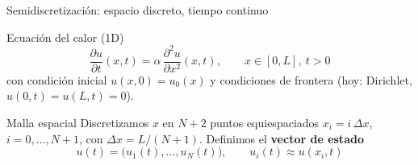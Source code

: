 \documentclass[aspectratio=169,12pt]{beamer}
\begin{document}
\begin{frame}{Semidiscretización: espacio discreto, tiempo continuo}
	\begin{defbox}{Ecuación del calor (1D)}
		\[
		\frac{\partial u}{\partial t}(x,t) = \alpha\,\frac{\partial^2 u}{\partial x^2}(x,t), \qquad x\in[0,L],\ t>0
		\]
		con condición inicial $u(x,0)=u_0(x)$ y condiciones de frontera (hoy: Dirichlet, $u(0,t)=u(L,t)=0$).
	\end{defbox}
	
	\vspace{6pt}
	\begin{resultbox}{Malla espacial}
		Discretizamos $x$ en $N+2$ puntos equiespaciados $x_i = i\,\Delta x$, $i=0,\ldots,N+1$, con $\Delta x = L/(N+1)$. Definimos el \textbf{vector de estado}
		\[
		u(t) = \bigl(u_1(t),\ldots,u_N(t)\bigr), \qquad u_i(t) \approx u(x_i,t)
		\]
	\end{resultbox}
	
\end{frame}

%			
%			
\end{document}
